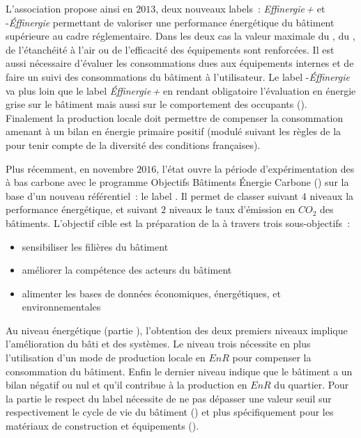 L’association 
propose ainsi en $2013$, deux nouveaux labels~: \textit{Effinergie\,+} et
-\textit{Éffinergie} permettant de valoriser une performance énergétique du
bâtiment supérieure au cadre réglementaire. Dans les deux cas la valeur maximale du
, du , de l’étanchéité à l’air ou de l’efficacité des
équipements sont renforcées. Il est aussi nécessaire d’évaluer les consommations dues aux
équipements internes et de faire un suivi des consommations du bâtiment à l’utilisateur.
Le label -\textit{Éffinergie} va plus loin que le label \textit{Éffinergie\,+}
en rendant obligatoire l’évaluation en énergie grise sur le bâtiment mais aussi sur le
comportement des occupants ().
Finalement la production locale doit permettre de compenser la consommation amenant à un
bilan en énergie primaire positif (modulé suivant les règles de la  pour
tenir compte de la diversité des conditions françaises).

Plus récemment, en novembre $2016$, l’état ouvre la période d’expérimentation des
 à bas carbone avec le programme Objectifs Bâtiments Énergie Carbone
() sur la base d’un nouveau référentiel~: le label 
\parencite{Ministere2016}. Il permet de classer suivant $4$ niveaux la performance énergétique,
et suivant $2$ niveaux le taux d’émission en $CO_{2}$ des bâtiments.
L’objectif cible est la préparation de la  à travers trois sous-objectifs~:
\begin{itemize}
    \item sensibiliser les filières du bâtiment
    \item améliorer la compétence des acteurs du bâtiment
    \item alimenter les bases de données économiques, énergétiques, et environnementales
\end{itemize}
Au niveau énergétique (partie ), l’obtention des deux premiers niveaux implique
l’amélioration du bâti et des systèmes. Le niveau trois nécessite en plus l’utilisation
d’un mode de production locale en $EnR$ pour compenser la consommation du bâtiment. Enfin
le dernier niveau indique que le bâtiment a un bilan négatif ou nul et qu’il contribue à
la production en $EnR$ du quartier. Pour la partie  le respect du label nécessite
de ne pas dépasser une valeur seuil sur respectivement le cycle de vie du bâtiment
() et plus spécifiquement pour les matériaux de construction et
équipements ().

